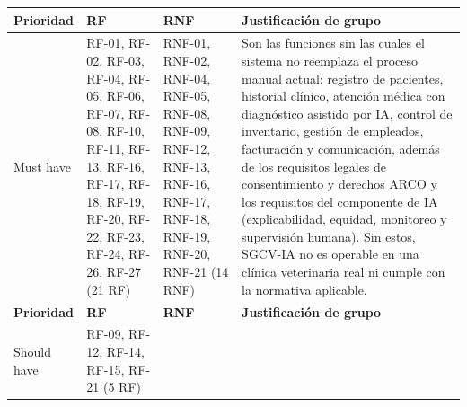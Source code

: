 \documentclass[
]{article}
\newcounter{none} %
\begin{document}
{\def\LTcaptype{none} %
\begin{longtable}[]{|
  >{\centering\arraybackslash}p{}|
  >{\raggedright\arraybackslash}p{}|
  >{\raggedright\arraybackslash}p{}|
  >{\raggedright\arraybackslash}p{}|}
\hline
\begin{minipage}[b]{\linewidth}\centering
\textbf{Prioridad}
\end{minipage} & \begin{minipage}[b]{\linewidth}\centering
\textbf{RF}
\end{minipage} & \begin{minipage}[b]{\linewidth}\centering
\textbf{RNF}
\end{minipage} & \begin{minipage}[b]{\linewidth}\centering
\textbf{Justificación de grupo}
\end{minipage} \\
\hline
\endhead
\hline
\endlastfoot
Must have & \begin{minipage}[t]{\linewidth}\raggedright
RF-01, RF-02, RF-03, RF-04, RF-05, RF-06, RF-07, RF-08, RF-10, RF-11,
RF-13, RF-16, RF-17, RF-18, RF-19, RF-20, RF-22, RF-23, RF-24, RF-26,
RF-27 (21 RF)
\end{minipage} &
\begin{minipage}[t]{\linewidth}\raggedright
RNF-01, RNF-02, RNF-04, RNF-05, RNF-08, RNF-09, RNF-12, RNF-13,
RNF-16, RNF-17, RNF-18, RNF-19, RNF-20, RNF-21 (14 RNF)
\end{minipage} & Son las funciones sin las cuales el sistema no
reemplaza el proceso manual actual: registro de pacientes, historial
clínico, atención médica con diagnóstico asistido por IA, control de
inventario, gestión de empleados, facturación y comunicación, además
de los requisitos legales de consentimiento y derechos ARCO y los
requisitos del componente de IA (explicabilidad, equidad, monitoreo y
supervisión humana). Sin estos, SGCV-IA no es operable en una clínica
veterinaria real ni cumple con la normativa aplicable. \\
\hline
\textbf{Prioridad} & \textbf{RF} & \textbf{RNF} & \textbf{Justificación
de grupo} \\
\hline
Should have & \begin{minipage}[t]{\linewidth}\raggedright
RF-09, RF-12, RF-14, RF-15, RF-21 (5 RF)
\end{minipage} & \begin{minipage}[t]{\linewidth}\raggedright

\end{minipage}
\end{longtable}}
\end{document}
